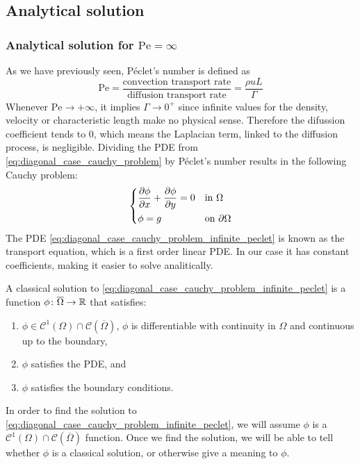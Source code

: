 
\subsection{Analytical solution}

\subsubsection{Analytical solution for \texorpdfstring{$\mathrm{Pe} = \infty$}{infinite Péclet's number}}

As we have previously seen, Péclet's number is defined as
\begin{equation}
	\mathrm{Pe} = 
	\frac{\text{convection transport rate}}{\text{diffusion transport rate}} = 
	\frac{\rho u L}{\Gamma}
\end{equation}
Whenever $\mathrm{Pe} \to +\infty$, it implies $\Gamma \to 0^+$ since infinite values for the density, velocity or characteristic length make no physical sense. Therefore the difussion coefficient tends to $0$, which means the Laplacian term, linked to the diffusion process, is negligible. Dividing the PDE from \eqref{eq:diagonal_case_cauchy_problem} by Péclet's number results in the following Cauchy problem:
\begin{equation} \label{eq:diagonal_case_cauchy_problem_infinite_peclet}
	\left\{
	\begin{aligned}
		&\pdv{\phi}{x} + \pdv{\phi}{y} = 0 &
		&\text{in } \Omega \\
		&\phi = g &
		&\text{on } \partial \Omega
	\end{aligned}
	\right.
\end{equation}
The PDE \eqref{eq:diagonal_case_cauchy_problem_infinite_peclet} is known as the transport equation, which is a first order linear PDE. In our case it has constant coefficients, making it easier to solve analitically.

\begin{definition}
	A classical solution to \eqref{eq:diagonal_case_cauchy_problem_infinite_peclet} is a function $\phi \colon \overline{\Omega} \rightarrow \mathbb{R}$ that satisfies:
	\begin{enumerate}[label={(\roman*)}, topsep=0pt]
		\item $\phi \in \mathcal{C}^1(\Omega) \cap \mathcal{C}(\overline{\Omega})$, \ie $\phi$ is differentiable with continuity in $\Omega$ and continuous up to the boundary,
		\item $\phi$ satisfies the PDE, and
		\item $\phi$ satisfies the boundary conditions.
	\end{enumerate}
\end{definition}
In order to find the solution to \eqref{eq:diagonal_case_cauchy_problem_infinite_peclet}, we will assume $\phi$ is a $\mathcal{C}^1(\Omega) \cap \mathcal{C}(\overline{\Omega})$ function. Once we find the solution, we will be able to tell whether $\phi$ is a classical solution, or otherwise give a meaning to $\phi$.

